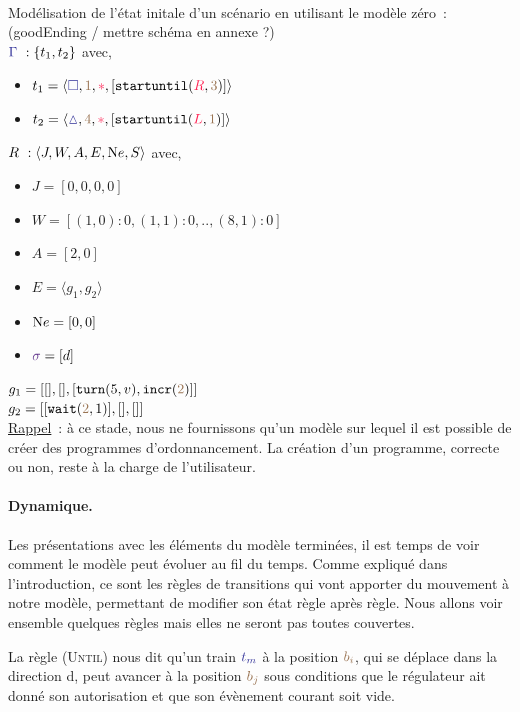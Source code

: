 \documentclass[oneside, a4paper, 11pt]{book}
\newcommand{\ruleFmt}[1]{\textsc{(#1)}}
\newcommand{\ruleDef}[1]{\hypertarget{#1}{\ruleFmt{#1}}}
\newcommand{\trainFmt}[1]{{\color{traincolor} #1}}
\newcommand{\trainTuple}[4]{\langle \trainFmt{#1}, \posFmt{#2}, \dirFmt{#3}, #4 \rangle}
\newcommand{\tid}[1]{\ensuremath{\trainFmt{t_{#1}}}}
\newcommand{\dirFmt}[1]{{\color{dircolor} #1}}
\newcommand{\posFmt}[1]{{\color{poscolor}{#1}}}
\newcommand{\bid}[1]{\ensuremath{\posFmt{b_{#1}}}}
\newcommand{\su}[2]{{\mbox{$\mathtt{startuntil}(\dirFmt{#1}, \posFmt{#2})$}}}
\newcommand{\incr}[1]{{\mbox{\ensuremath{\mathtt{incr}(\posFmt{#1})}}}}
\newcommand{\turnOrder}[2]{{\mbox{\ensuremath{\mathtt{turn}(#1, #2)}}}}
\newcommand{\wait}[2]{{\mbox{\ensuremath{\mathtt{wait}(\posFmt{#1}, #2)}}}}
\newcommand{\swFmt}[1]{{\color{swcolor}{#1}}}
\begin{document}
\begin{example}[GoodEnding M0]
	~\\
	Modélisation de l'état initale d'un scénario en utilisant le modèle zéro~: (goodEnding / mettre schéma en annexe ?)
	\\$\trainFmt{\Gamma}~: \{t_1, t_2\}$ avec,
	\begin{itemize}
		\item[] $t_1 = \trainTuple{\square}{1}{*}{[\su{R}{3}]}$
		\item[] $t_2 = \trainTuple{\vartriangle}{4}{*}{[\su{L}{1}]}$
	\end{itemize}
	\vspace{0.3cm}
	$R~: \langle J,W,A,E,{\text Ne},S \rangle$ avec,	
	\begin{itemize}
		\item[] $J = [0,0,0,0]$
		\item[] $W = [(1,0) : 0, (1,1) : 0, .., (8,1) : 0]$
		\item[] $A = [2,0]$
		\item[] $E = \langle g_1, g_2 \rangle$
		\item[] ${\text Ne} = [0, 0]$
		\item[] $\swFmt{\sigma} = [d]$
	\end{itemize}
	\vspace{0.3cm}
	$g_1 = [[],[],[\turnOrder{5}{v}, \incr{2}]]$
	\\$g_2 = [[\wait{2}{1}],[],[]]$
	\vspace{0.5cm}\\
	\underline{Rappel}~: à ce stade, nous ne fournissons qu'un modèle sur lequel il est possible de créer des programmes d'ordonnancement. La création d'un programme, correcte ou non, reste à la charge de l'utilisateur.
\end{example}


\paragraph{Dynamique.} 
Les présentations avec les éléments du modèle terminées, il est temps de voir comment le modèle peut évoluer au fil du temps.
Comme expliqué dans l'introduction, ce sont les règles de transitions qui vont apporter du mouvement à notre modèle, permettant de modifier son état règle après règle. Nous allons voir ensemble quelques règles mais elles ne seront pas toutes couvertes.

La règle \ruleDef{Until} nous dit qu'un train \tid{m} à la position \bid{i}, qui se déplace dans la direction \dirFmt{d}, peut avancer à la position \bid{j} sous conditions que le régulateur ait donné son autorisation et que son évènement courant soit vide.
\end{document}
